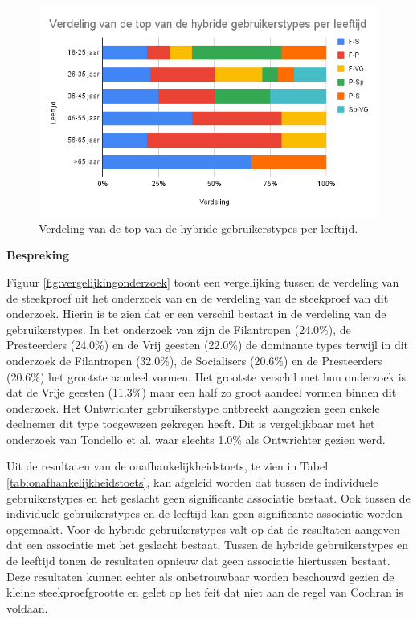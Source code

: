 \begin{figure}
    \includegraphics[width=\linewidth]{HybrideLeeftijd.png}
    \caption{Verdeling van de top van de hybride gebruikerstypes per leeftijd.}
    \label{fig:hybrideleeftijd}
\end{figure}

\textbf{Bespreking}

Figuur \ref{fig:vergelijkingonderzoek} toont een vergelijking tussen de verdeling van de steekproef uit het onderzoek van \textcite{Tondello2016} en de verdeling van de steekproef van dit onderzoek. Hierin is te zien dat er een verschil bestaat in de verdeling van de gebruikerstypes. In het onderzoek van \textcite{Tondello2016} zijn de Filantropen (24.0\%), de Presteerders (24.0\%) en de Vrij geesten (22.0\%) de dominante types terwijl in dit onderzoek de Filantropen (32.0\%), de Socialisers (20.6\%) en de Presteerders (20.6\%) het grootste aandeel vormen. Het grootste verschil met hun onderzoek is dat de Vrije geesten (11.3\%) maar een half zo groot aandeel vormen binnen dit onderzoek. Het Ontwrichter gebruikerstype ontbreekt aangezien geen enkele deelnemer dit type toegewezen gekregen heeft. Dit is vergelijkbaar met het onderzoek van Tondello et al. waar slechts 1.0\% als Ontwrichter gezien werd.

Uit de resultaten van de onafhankelijkheidstoets, te zien in Tabel \ref{tab:onafhankelijkheidstoets}, kan afgeleid worden dat tussen de individuele gebruikerstypes en het geslacht geen significante associatie bestaat. Ook tussen de individuele gebruikerstypes en de leeftijd kan geen significante associatie worden opgemaakt. Voor de hybride gebruikerstypes valt op dat de resultaten aangeven dat een associatie met het geslacht bestaat. Tussen de hybride gebruikerstypes en de leeftijd tonen de resultaten opnieuw dat geen associatie hiertussen bestaat. Deze resultaten kunnen echter als onbetrouwbaar worden beschouwd gezien de kleine steekproefgrootte en gelet op het feit dat niet aan de regel van Cochran is voldaan.

